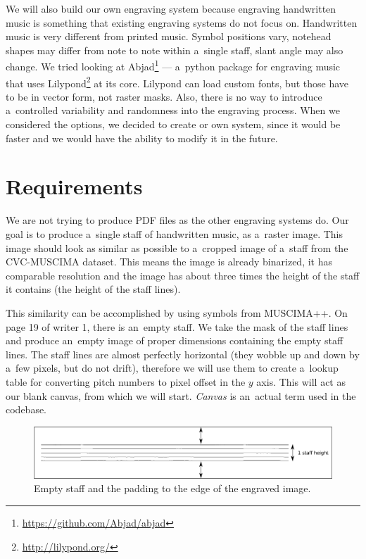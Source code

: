 We will also build our own engraving system because engraving handwritten music is something that existing engraving systems do not focus on. Handwritten music is very different from printed music. Symbol positions vary, notehead shapes may differ from note to note within a~single staff, slant angle may also change. We tried looking at Abjad\footnote{\href{https://github.com/Abjad/abjad}{https://github.com/Abjad/abjad}} --- a~python package for engraving music that uses Lilypond\footnote{\href{http://lilypond.org/}{http://lilypond.org/}} at its core. Lilypond can load custom fonts, but those have to be in vector form, not raster masks. Also, there is no way to introduce a~controlled variability and randomness into the engraving process. When we considered the options, we decided to create or own system, since it would be faster and we would have the ability to modify it in the future.


\section{Requirements}

We are not trying to produce PDF files as the other engraving systems do. Our goal is to produce a~single staff of handwritten music, as a~raster image. This image should look as similar as possible to a~cropped image of a~staff from the CVC-MUSCIMA dataset. This means the image is already binarized, it has comparable resolution and the image has about three times the height of the staff it contains (the height of the staff lines).

This similarity can be accomplished by using symbols from MUSCIMA++. On page 19 of writer 1, there is an~empty staff. We take the mask of the staff lines and produce an~empty image of proper dimensions containing the empty staff lines. The staff lines are almost perfectly horizontal (they wobble up and down by a~few pixels, but do not drift), therefore we will use them to create a~lookup table for converting pitch numbers to pixel offset in the $y$ axis. This will act as our blank canvas, from which we will start. \emph{Canvas} is an~actual term used in the codebase.

\begin{figure}[h]
    \centering
    \includegraphics[width=140mm]{../img/staff-padding}
    \caption{Empty staff and the padding to the edge of the engraved image.}
    \label{fig5:EmptyStaffWithPadding}
\end{figure}

